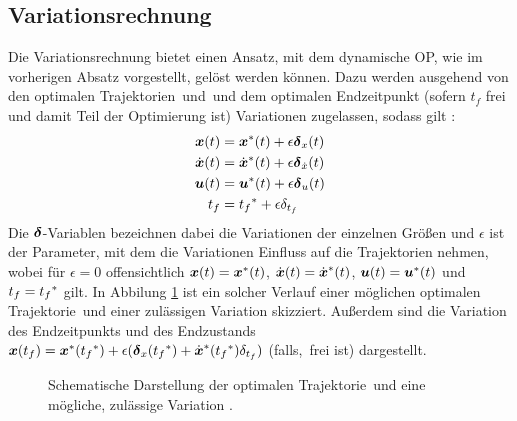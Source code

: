 \subsection{Variationsrechnung}\label{subsec:Variationsrechnung}
Die Variationsrechnung bietet einen Ansatz, mit dem dynamische \gls{OP}, wie im vorherigen Absatz vorgestellt, gelöst werden können. Dazu werden ausgehend von den optimalen Trajektorien \xoptoft\,und \uoptoft\,und dem optimalen Endzeitpunkt  (sofern $t_f$ frei und damit Teil der Optimierung ist) Variationen zugelassen, sodass gilt \cite{KnutGraichen.2012}:
\begin{align}
\boldsymbol{x}(t) &= {\boldsymbol{x}}^*(t) + \epsilon\boldsymbol{\delta}_{x}(t) \label{eq:x_var}\\
\dot{\boldsymbol{x}}(t) &= \dot{\boldsymbol{x}}^*(t) + \epsilon\boldsymbol{\delta}_{\dot{x}}(t) \label{eq:dx_var}\\
\boldsymbol{u}(t) &= {\boldsymbol{u}}^*(t) + \epsilon\boldsymbol{\delta}_{u}(t) \label{eq:u_var}\\
t_f &= {t_f}^* + \epsilon\delta_{t_f}\label{eq:t_var}
\end{align}
Die $\boldsymbol{\delta}$-Variablen bezeichnen dabei die Variationen der einzelnen Größen und $\epsilon$ ist der Parameter, mit dem die Variationen Einfluss auf die Trajektorien nehmen, wobei für $\epsilon=0$ offensichtlich $\boldsymbol{x}(t)={\boldsymbol{x}}^*(t)$, $\dot{\boldsymbol{x}}(t) = \dot{\boldsymbol{x}}^*(t)$, $\boldsymbol{u}(t)={\boldsymbol{u}}^*(t)$ und $t_f={t_f}^*$ gilt. In Abbilung \ref{fig:Variation} ist ein solcher Verlauf einer möglichen optimalen Trajektorie \xoptoft\,und einer zulässigen Variation skizziert. Außerdem sind die Variation des Endzeitpunkts und des Endzustands $\boldsymbol{x}(t_f) = {\boldsymbol{x}}^*({t_f}^*)+\epsilon(\boldsymbol{\delta}_{x}({t_f}^*)+\dot{\boldsymbol{x}}^*({t_f}^*)\delta_{t_f})$ (falls, \xoftf\,frei ist) dargestellt.
\begin{figure}[h]
\centering
{}
\caption{Schematische Darstellung der optimalen Trajektorie \xoptoft\,und eine mögliche, zulässige Variation \xoft.}
\label{fig:Variation}
\end{figure}

